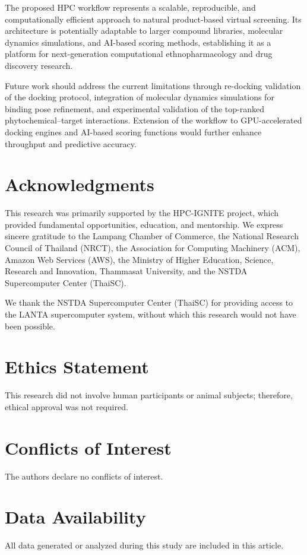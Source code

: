 \documentclass[11pt,a4paper]{article}
\begin{document}
The proposed HPC workflow represents a scalable, reproducible, and computationally efficient approach to natural product-based virtual screening. Its architecture is potentially adaptable to larger compound libraries, molecular dynamics simulations, and AI-based scoring methods, establishing it as a platform for next-generation computational ethnopharmacology and drug discovery research.

Future work should address the current limitations through re-docking validation of the docking protocol, integration of molecular dynamics simulations for binding pose refinement, and experimental validation of the top-ranked phytochemical--target interactions. Extension of the workflow to GPU-accelerated docking engines and AI-based scoring functions would further enhance throughput and predictive accuracy.


\section*{Acknowledgments}

This research was primarily supported by the HPC-IGNITE project, which provided fundamental opportunities, education, and mentorship. We express sincere gratitude to the Lampang Chamber of Commerce, the National Research Council of Thailand (NRCT), the Association for Computing Machinery (ACM), Amazon Web Services (AWS), the Ministry of Higher Education, Science, Research and Innovation, Thammasat University, and the NSTDA Supercomputer Center (ThaiSC).

We thank the NSTDA Supercomputer Center (ThaiSC) for providing access to the LANTA supercomputer system, without which this research would not have been possible.


\section*{Ethics Statement}

This research did not involve human participants or animal subjects; therefore, ethical approval was not required.

\section*{Conflicts of Interest}

The authors declare no conflicts of interest.

\section*{Data Availability}

All data generated or analyzed during this study are included in this article.




\end{document}

